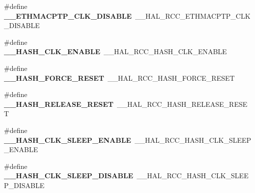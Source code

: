 \begin{DoxyCompactItemize}
\item 
\#define {\bfseries \+\_\+\+\_\+\+E\+T\+H\+M\+A\+C\+P\+T\+P\+\_\+\+C\+L\+K\+\_\+\+D\+I\+S\+A\+B\+LE}~\+\_\+\+\_\+\+H\+A\+L\+\_\+\+R\+C\+C\+\_\+\+E\+T\+H\+M\+A\+C\+P\+T\+P\+\_\+\+C\+L\+K\+\_\+\+D\+I\+S\+A\+B\+LE\hypertarget{group___h_a_l___r_c_c___aliased_gaff291385ffdf68d3d1d336cd4fa0f72e}{}\label{group___h_a_l___r_c_c___aliased_gaff291385ffdf68d3d1d336cd4fa0f72e}

\item 
\#define {\bfseries \+\_\+\+\_\+\+H\+A\+S\+H\+\_\+\+C\+L\+K\+\_\+\+E\+N\+A\+B\+LE}~\+\_\+\+\_\+\+H\+A\+L\+\_\+\+R\+C\+C\+\_\+\+H\+A\+S\+H\+\_\+\+C\+L\+K\+\_\+\+E\+N\+A\+B\+LE\hypertarget{group___h_a_l___r_c_c___aliased_ga27a43502b6e59c8eb666781a340b412b}{}\label{group___h_a_l___r_c_c___aliased_ga27a43502b6e59c8eb666781a340b412b}

\item 
\#define {\bfseries \+\_\+\+\_\+\+H\+A\+S\+H\+\_\+\+F\+O\+R\+C\+E\+\_\+\+R\+E\+S\+ET}~\+\_\+\+\_\+\+H\+A\+L\+\_\+\+R\+C\+C\+\_\+\+H\+A\+S\+H\+\_\+\+F\+O\+R\+C\+E\+\_\+\+R\+E\+S\+ET\hypertarget{group___h_a_l___r_c_c___aliased_ga2dd43b4ddd51ec5b1242492e094d3a13}{}\label{group___h_a_l___r_c_c___aliased_ga2dd43b4ddd51ec5b1242492e094d3a13}

\item 
\#define {\bfseries \+\_\+\+\_\+\+H\+A\+S\+H\+\_\+\+R\+E\+L\+E\+A\+S\+E\+\_\+\+R\+E\+S\+ET}~\+\_\+\+\_\+\+H\+A\+L\+\_\+\+R\+C\+C\+\_\+\+H\+A\+S\+H\+\_\+\+R\+E\+L\+E\+A\+S\+E\+\_\+\+R\+E\+S\+ET\hypertarget{group___h_a_l___r_c_c___aliased_gac3ede6a3866857961ca8374a199bfa69}{}\label{group___h_a_l___r_c_c___aliased_gac3ede6a3866857961ca8374a199bfa69}

\item 
\#define {\bfseries \+\_\+\+\_\+\+H\+A\+S\+H\+\_\+\+C\+L\+K\+\_\+\+S\+L\+E\+E\+P\+\_\+\+E\+N\+A\+B\+LE}~\+\_\+\+\_\+\+H\+A\+L\+\_\+\+R\+C\+C\+\_\+\+H\+A\+S\+H\+\_\+\+C\+L\+K\+\_\+\+S\+L\+E\+E\+P\+\_\+\+E\+N\+A\+B\+LE\hypertarget{group___h_a_l___r_c_c___aliased_gae9acd455370cd79310252130c349f838}{}\label{group___h_a_l___r_c_c___aliased_gae9acd455370cd79310252130c349f838}

\item 
\#define {\bfseries \+\_\+\+\_\+\+H\+A\+S\+H\+\_\+\+C\+L\+K\+\_\+\+S\+L\+E\+E\+P\+\_\+\+D\+I\+S\+A\+B\+LE}~\+\_\+\+\_\+\+H\+A\+L\+\_\+\+R\+C\+C\+\_\+\+H\+A\+S\+H\+\_\+\+C\+L\+K\+\_\+\+S\+L\+E\+E\+P\+\_\+\+D\+I\+S\+A\+B\+LE\hypertarget{group___h_a_l___r_c_c___aliased_ga1e1531b67894be54ccf3e76229a96e68}{}\label{group___h_a_l___r_c_c___aliased_ga1e1531b67894be54ccf3e76229a96e68}


\end{DoxyCompactItemize}
